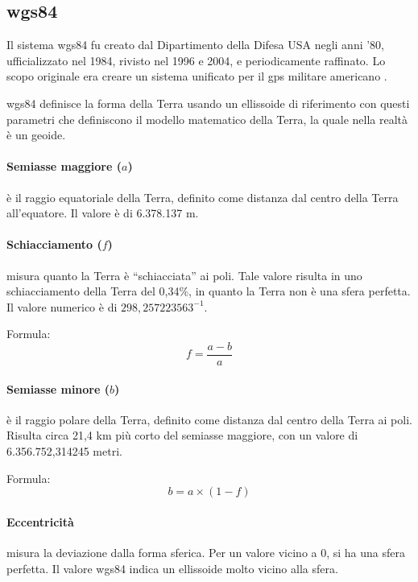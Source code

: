 \subsection{\acrshort{wgs84}}

Il sistema \acrshort{wgs84} fu creato dal Dipartimento della Difesa USA negli anni '80, ufficializzato nel 1984,
rivisto nel 1996 e 2004, e periodicamente raffinato. Lo scopo originale era creare un sistema unificato
per il \acrshort{gps} militare americano \cite{wgs84updates}.

\acrshort{wgs84} definisce la forma della Terra usando un ellissoide di riferimento con questi parametri che definiscono
il modello matematico della Terra, la quale nella realtà è un geoide.

\paragraph{Semiasse maggiore ($a$)} è il raggio equatoriale della Terra, definito come distanza dal centro della Terra
all'equatore. Il valore è di 6.378.137 m.

\paragraph{Schiacciamento ($f$)} misura quanto la Terra è ``schiacciata'' ai poli.
Tale valore risulta in uno schiacciamento della Terra del 0,34\%, in quanto la Terra non è una sfera perfetta.
Il valore numerico è di ${298{,}257223563}^{-1}$.

Formula:
\begin{equation}
  f = \frac{a - b}{a}
\end{equation}

\paragraph{Semiasse minore ($b$)} è il raggio polare della Terra, definito come distanza dal centro della Terra ai poli.
Risulta circa 21,4 km più corto del semiasse maggiore, con un valore di 6.356.752,314245 metri.

Formula:
\begin{equation}
  b = a \times (1 - f)
\end{equation}

\paragraph{Eccentricità} misura la deviazione dalla forma sferica.
Per un valore vicino a 0, si ha una sfera perfetta.
Il valore \acrshort{wgs84} indica un ellissoide molto vicino alla sfera.

